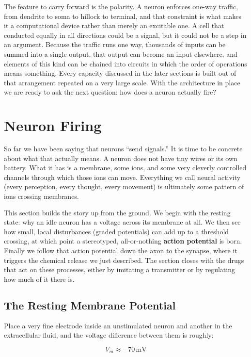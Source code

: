 \documentclass[11pt]{article}
\begin{document}
The feature to carry forward is the polarity. A neuron enforces one-way traffic, from dendrite to soma to hillock to terminal, and that constraint is what makes it a computational device rather than merely an excitable one. A cell that conducted equally in all directions could be a signal, but it could not be a step in an argument. Because the traffic runs one way, thousands of inputs can be summed into a single output, that output can become an input elsewhere, and elements of this kind can be chained into circuits in which the order of operations means something. Every capacity discussed in the later sections is built out of that arrangement repeated on a very large scale. With the architecture in place we are ready to ask the next question: how does a neuron actually fire?


\section{Neuron Firing}

So far we have been saying that neurons ``send signals.'' It is time to be concrete about what that actually means. A neuron does not have tiny wires or its own battery. What it has is a membrane, some ions, and some very cleverly controlled channels through which those ions can move. Everything we call neural activity (every perception, every thought, every movement) is ultimately some pattern of ions crossing membranes.

This section builds the story up from the ground. We begin with the resting state: why an idle neuron has a voltage across its membrane at all. We then see how small, local disturbances (graded potentials) can add up to a threshold crossing, at which point a stereotyped, all-or-nothing \textbf{action potential} is born. Finally we follow that action potential down the axon to the synapse, where it triggers the chemical release we just described. The section closes with the drugs that act on these processes, either by imitating a transmitter or by regulating how much of it there is.

\subsection{The Resting Membrane Potential}

Place a very fine electrode inside an unstimulated neuron and another in the extracellular fluid, and the voltage difference between them is roughly:

\[
V_m \approx -70 \, \text{mV}
\]
\end{document}
